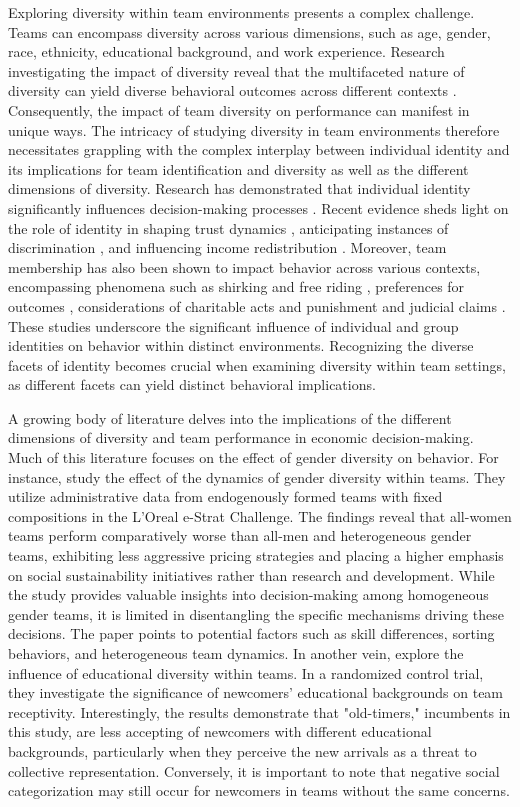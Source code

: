 \hspace *{0mm} Exploring diversity within team environments presents a complex challenge. Teams can encompass diversity across various dimensions, such as age, gender, race, ethnicity, educational background, and work experience. Research investigating the impact of diversity reveal that the multifaceted nature of diversity can yield diverse behavioral outcomes across different contexts \citep{clls14}. Consequently, the impact of team diversity on performance can manifest in unique ways. The intricacy of studying diversity in team environments therefore necessitates grappling with the complex interplay between individual identity and its implications for team identification and diversity as well as the different dimensions of diversity. Research has demonstrated that individual identity significantly influences decision-making processes \citep{ ak08}. Recent evidence sheds light on the role of identity in shaping trust dynamics \citep{cde22}, anticipating instances of discrimination \citep{ack23}, and influencing income redistribution \citep{fghz23}. Moreover, team membership has also been shown to impact behavior across various contexts, encompassing phenomena such as shirking and free riding \citep{eg05}, preferences for outcomes \citep{crrbcdfggllmrwy07}, considerations of charitable acts and punishment \citep{chen2009group} and judicial claims \citep{sz11}. These studies underscore the significant influence of individual and group identities on behavior within distinct environments. Recognizing the diverse facets of identity becomes crucial when examining diversity within team settings, as different facets can yield distinct behavioral implications.

\hspace *{0mm} A growing body of literature delves into the implications of the different dimensions of diversity and team performance in economic decision-making. Much of this literature focuses on the effect of gender diversity on behavior. For instance, \cite{aai12} study the effect of the dynamics of gender diversity within teams. They utilize administrative data from endogenously formed teams with fixed compositions in the L'Oreal e-Strat Challenge. The findings reveal that all-women teams perform comparatively worse than all-men and heterogeneous gender teams, exhibiting less aggressive pricing strategies and placing a higher emphasis on social sustainability initiatives rather than research and development. While the study provides valuable insights into decision-making among homogeneous gender teams, it is limited in disentangling the specific mechanisms driving these decisions. The paper points to potential factors such as skill differences, sorting behaviors, and heterogeneous team dynamics. In another vein, \cite{am18} explore the influence of educational diversity within teams. In a randomized control trial, they investigate the significance of newcomers' educational backgrounds on team receptivity. Interestingly, the results demonstrate that "old-timers," incumbents in this study, are less accepting of newcomers with different educational backgrounds, particularly when they perceive the new arrivals as a threat to collective representation. Conversely, it is important to note that negative social categorization may still occur for newcomers in teams without the same concerns.

